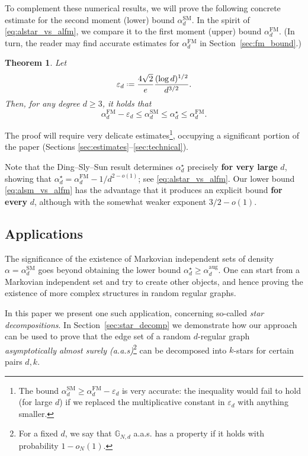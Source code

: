 \documentclass[12pt]{amsart}
\newtheorem{theorem}{Theorem}[section]
\theoremstyle{definition}
\newcommand\Gb{\mathbb{G}}
\newcommand\al{\alpha}
\newcommand\eps{\varepsilon}
\newcommand\alstar{\alpha^{\star}}
\newcommand\alfm{\alpha^{\mathrm{FM}}}
\newcommand\alsm{\alpha^{\mathrm{SM}}}
\newcommand\alaug{\alpha^{\mathrm{aug}}}
\newcommand{\defeq}{\mathrel{\vcenter{\baselineskip0.5ex \lineskiplimit0pt
                     \hbox{\scriptsize.}\hbox{\scriptsize.}}}%
                     =}
\begin{document}
To complement these numerical results, we will prove the following concrete estimate for the second moment (lower) bound $\alsm_d$. In the spirit of \eqref{eq:alstar_vs_alfm}, we compare it to the first moment (upper) bound $\alfm_d$. (In turn, the reader may find accurate estimates for $\alfm_d$ in Section~\ref{sec:fm_bound}.)
%
\begin{theorem} \label{thm:vs_alfm}
Let 
%
\begin{equation} \label{eq:eps_d}
\eps_d \defeq \frac{4\sqrt{2}}{e} \frac{(\log d)^{1/2}}{d^{3/2}} .
\end{equation}
%
Then, for any degree $d \geq 3$, it holds that  
%
\begin{equation} \label{eq:alsm_vs_alfm}
\alfm_d - \eps_d 
\leq \alsm_d
\leq \alstar_d 
\leq \alfm_d .
\end{equation}
%
\end{theorem}
%
The proof will require very delicate estimates\footnote{The bound $\alsm_d \geq \alfm_d - \eps_d$ is very accurate: the inequality would fail to hold (for large $d$) if we replaced the multiplicative constant in $\eps_d$ with anything smaller.}, occupying a significant portion of the paper (Sections \ref{sec:estimates}--\ref{sec:technical}). 

Note that the Ding--Sly--Sun result \cite{ding2016maximum} determines $\alstar_d$ precisely \textbf{for very large} $d$, showing that $\alstar_d = \alfm_d- 1/d^{2-o(1)}$; see \eqref{eq:alstar_vs_alfm}. Our lower bound \eqref{eq:alsm_vs_alfm} has the advantage that it produces an explicit bound \textbf{for every} $d$, although with the somewhat weaker exponent  $3/2-o(1)$.

\subsection{Applications}

The significance of the existence of Markovian independent sets of density $\al=\alsm_d$ goes beyond obtaining the lower bound $\alstar_d \geq \alaug_d$. One can start from a Markovian independent set and try to create other objects, and hence proving the existence of more complex structures in random regular graphs. %

In this paper we present one such application, concerning so-called \emph{star decompositions}. In Section~\ref{sec:star_decomp} we demonstrate how our approach can be used to prove that the edge set of a random $d$-regular graph \emph{asymptotically almost surely (a.a.s)}\footnote{For a fixed $d$, we say that $\Gb_{N,d}$ a.a.s. has a property if it holds with probability $1-o_N(1)$.} can be decomposed into $k$-stars for certain pairs $d,k$. 
\end{document}

